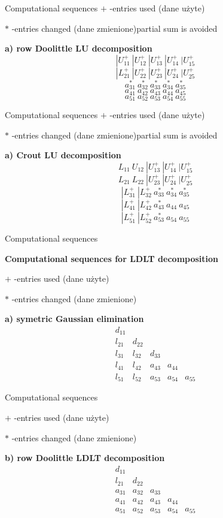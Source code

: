 \begin{frame}{Computational sequences}
$+$ -entries used (dane użyte)

$*$ -entries changed (dane zmienione)partial sum is avoided


\textbf{a) row Doolittle LU decomposition}
$$
|U_{11}^{+}\ |U_{12}^{+}\ |U_{13}^{+}\ |U_{14}^{+}\ |U_{15}^{+}
$$
$$
|L_{21}^{+}\ |U_{22}^{+}\ |U_{23}^{+}\ |U_{24}^{+}\ |U_{25}^{+} 
$$
$$
a_{31}^{*}\ a_{32}^{*}\ a_{33}^{*}\ a_{34}^{*}\ a_{35}^{*}
$$
$$
a_{41}\ a_{42}\ a_{43}\ a_{44}\ a_{45} 
$$
$$
a_{51}\ a_{52}\ a_{53}\  a_{54}\ a_{55}
$$

\end{frame}
\begin{frame}{Computational sequences}
$+$ -entries used (dane użyte)

$*$ -entries changed (dane zmienione)partial sum is avoided


\textbf{a) Crout LU decomposition}
$$
L_{11}\ U_{12}\ |U_{13}^{+}\ |U_{14}^{+}\ |U_{15}^{+} 
$$
$$
L_{21}\ L_{22}\ |U_{23}^{+}\ |U_{24}^{+}\ |U_{25}^{+} 
$$
$$
|L_{31}^{+}\ |L_{32}^{+}\ a_{33}^{*}\ a_{34}^{*}\ a_{35}^{*}
$$
$$
|L_{41}^{+}\ |L_{42}^{+}\ a_{43}^{*}\ a_{44}\ a_{45}
$$
$$
|L_{51}^{+}\ |L_{52}^{+}\ a_{53}^{*}\ a_{54}\ a_{55}
$$

\end{frame}
\begin{frame}{Computational sequences}

\textbf{Computational sequences for LDLT decomposition}

$+$ -entries used (dane użyte)

$*$ -entries changed (dane zmienione)

\textbf{a) symetric Gaussian elimination}
$$
\begin{array}{lllll}

d_{11} \\
l_{21} & d_{22}\\
l_{31} & l_{32} & d_{33}\\
l_{41} & l_{42} & a_{43} & a_{44}\\
l_{51} & l_{52} & a_{53} & a_{54} & a_{55}

\end{array}
$$

\end{frame}
\begin{frame}{Computational sequences}

$+$ -entries used (dane użyte)

$*$ -entries changed (dane zmienione)

\textbf{b) row Doolittle LDLT decomposition}
$$
\begin{array}{lllll}
d_{11} \\
l_{21} & d_{22} \\
a_{31} & a_{32} & a_{33}\\
a_{41} & a_{42} & a_{43} & a_{44} \\
a_{51} & a_{52} & a_{53} & a_{54} & a_{55}
\end{array}
$$

\end{frame} 
